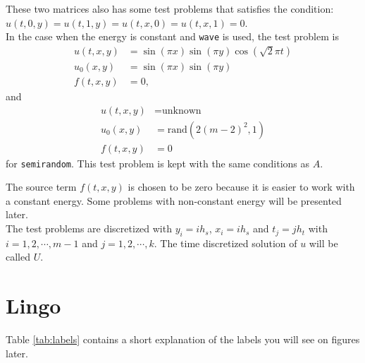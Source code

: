 These two matrices also has some test problems that satisfies the condition: $u(t,0,y) = u(t,1,y) = u(t,x,0) = u(t,x,1) = 0$. \\

In the case when the energy is constant and \texttt{wave} is used, the test problem is 
\begin{equation}
\begin{aligned}
u(t,x,y) &= \sin(\pi x) \sin(\pi y) \cos(\sqrt{2} \pi t) \\
u_0(x,y) &= \sin( \pi x) \sin(\pi y) \\
f(t,x,y) &= 0 ,
\end{aligned}
\end{equation}
and 
\begin{equation}
\begin{aligned}
u(t,x,y) &= \text{unknown} \\
u_0(x,y) &= \text{rand} (2 (m-2)^2,1) \\
f(t,x,y) &= 0
\end{aligned}
\end{equation}
for \texttt{semirandom}. This test problem is kept with the same conditions as $A$.

The source term $f(t,x,y)$ is chosen to be zero because it is easier to work with a constant energy. Some problems with non-constant energy will be presented later.\\

The test problems are discretized with $y_i = i h_s$, $x_i = i h_s$ and $t_j = j h_t$ with $i = 1,2,\cdots,m-1 $ and $ j = 1,2,\cdots,k $. The time discretized solution of $u$ will be called $U$.


\section{Lingo}
Table \ref{tab:labels} contains a short explanation of the labels you will see on figures later. 


